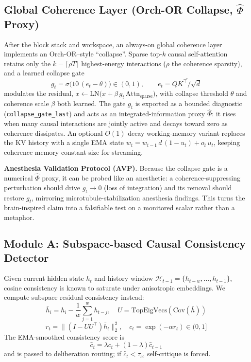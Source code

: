 \documentclass[10pt,twocolumn]{article}
\begin{document}
\subsection{Global Coherence Layer (Orch-OR Collapse, $\hat{\Phi}$ Proxy)}
After the block stack and workspace, an always-on global coherence layer implements an Orch-OR--style ``collapse''. Sparse top-$k$ causal self-attention retains only the $k=\lceil \rho T\rceil$ highest-energy interactions ($\rho$ the coherence sparsity), and a learned collapse gate
\begin{equation}
g_t=\sigma\!\big(10\,(\bar{e}_t-\theta)\big)\in(0,1),\qquad
\bar{e}_t=\overline{QK^\top/\sqrt{d}}
\end{equation}
modulates the residual, $x \leftarrow \mathrm{LN}\!\big(x+\beta\,g_t\,\mathrm{Attn}_{\text{sparse}}\big)$, with collapse threshold $\theta$ and coherence scale $\beta$ both learned. The gate $g_t$ is exported as a bounded diagnostic (\texttt{collapse\_gate\_last}) and acts as an integrated-information proxy $\hat{\Phi}$: it rises when many causal interactions are jointly active and decays toward zero as coherence dissipates. An optional $O(1)$ decay working-memory variant replaces the KV history with a single EMA state $w_t=w_{t-1}\,d\,(1-u_t)+o_t\,u_t$, keeping coherence memory constant-size for streaming.

\textbf{Anesthesia Validation Protocol (AVP).} Because the collapse gate is a numerical $\hat{\Phi}$ proxy, it can be probed like an anesthetic: a coherence-suppressing perturbation should drive $g_t\to0$ (loss of integration) and its removal should restore $g_t$, mirroring microtubule-stabilization anesthesia findings. This turns the brain-inspired claim into a falsifiable test on a monitored scalar rather than a metaphor.

\subsection{Module A: Subspace-based Causal Consistency Detector}
Given current hidden state $h_t$ and history window $\mathcal{H}_{t-1}=\{h_{t-w},...,h_{t-1}\}$, cosine consistency is known to saturate under anisotropic embeddings. We compute subspace residual consistency instead:
\begin{equation}
\bar{h}_i=h_i-\frac{1}{w}\sum_{j=1}^{w}h_{t-j},\quad U=\text{TopEigVecs}(\text{Cov}(\bar{h}))
\end{equation}
\begin{equation}
r_t = \lVert (I-UU^\top)\bar{h}_t \rVert_2^2,\quad c_t = \exp(-\alpha r_t) \in (0,1]
\end{equation}
The EMA-smoothed consistency score is
\begin{equation}
\hat{c}_t = \lambda c_t + (1-\lambda)\hat{c}_{t-1}
\end{equation}
and is passed to deliberation routing; if $\hat{c}_t<\tau_c$, self-critique is forced.
\end{document}
